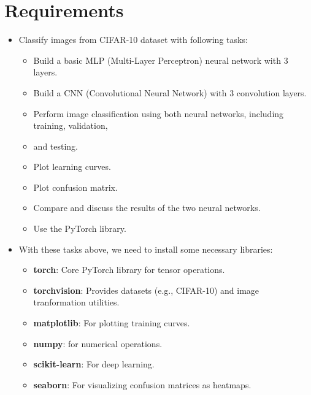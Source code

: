\documentclass[a4paper,12pt]{article}
\begin{document}
\renewcommand{\figurename}{Image}

\renewcommand{\contentsname}{Contents}

\setlength{\cftbeforesecskip}{12pt}       
\setlength{\cftbeforesubsecskip}{8pt}     

\setlength{\cftbeforesecskip}{20pt}
\setlength{\cftbeforesubsecskip}{12pt}

{\large
\tableofcontents
}
\newpage

\section{Requirements}
\begin{itemize}
    \item Classify images from CIFAR-10 dataset with following tasks:
    \begin{itemize}[label= -]
        \item Build a basic MLP (Multi-Layer Perceptron) neural network with 3 layers.
        \item Build a CNN (Convolutional Neural Network) with 3 convolution layers.
        \item Perform image classification using both neural networks, including training, validation,
        \item and testing.
        \item Plot learning curves.
        \item Plot confusion matrix.
        \item Compare and discuss the results of the two neural networks.
        \item Use the PyTorch library.
    \end{itemize}

    \item With these tasks above, we need to install some necessary libraries:
    \begin{itemize}[label= -]
        \item \textbf{torch}: Core PyTorch library for tensor operations.
        \item \textbf{torchvision}: Provides datasets (e.g., CIFAR-10) and image tranformation utilities.
        \item \textbf{matplotlib}: For plotting training curves.
        \item \textbf{numpy}: for numerical operations.
        \item \textbf{scikit-learn}: For deep learning.
        \item \textbf{seaborn}: For visualizing confusion matrices as heatmaps.
    \end{itemize}
\end{itemize}
\newpage 
\end{document}
